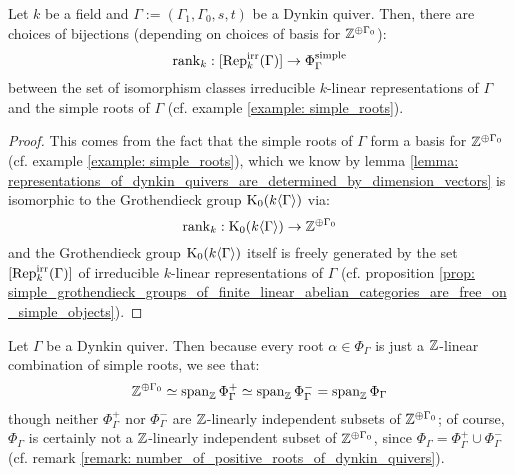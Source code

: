             \begin{proposition} \label{prop: irreducible_representations_of_dynkin_quivers_are_labelled_by_simple_roots}
                Let $k$ be a field and $\Gamma := (\Gamma_1, \Gamma_0, s, t)$ be a Dynkin quiver. Then, there are choices of bijections (depending on choices of basis for $\mathbb{Z}^{\oplus \Gamma_0}$):
                    $$\operatorname{rank}_k: [\mathrm{Rep}_k^{\mathrm{irr}}(\Gamma)] \to \Phi_{\Gamma}^{\mathrm{simple}}$$
                between the set of isomorphism classes irreducible $k$-linear representations of $\Gamma$ and the simple roots of $\Gamma$ (cf. example \ref{example: simple_roots}).
            \end{proposition}
                \begin{proof}
                    This comes from the fact that the simple roots of $\Gamma$ form a basis for $\mathbb{Z}^{\oplus \Gamma_0}$ (cf. example \ref{example: simple_roots}), which we know by lemma \ref{lemma: representations_of_dynkin_quivers_are_determined_by_dimension_vectors} is isomorphic to the Grothendieck group $\mathrm{K}_0(k\langle\Gamma\rangle)$ via:
                        $$\operatorname{rank}_k: \mathrm{K}_0(k\langle\Gamma\rangle) \to \mathbb{Z}^{\oplus \Gamma_0}$$
                    and the Grothendieck group $\mathrm{K}_0(k\langle\Gamma\rangle)$ itself is freely generated by the set $[\mathrm{Rep}_k^{\mathrm{irr}}(\Gamma)]$ of irreducible $k$-linear representations of $\Gamma$ (cf. proposition \ref{prop: simple_grothendieck_groups_of_finite_linear_abelian_categories_are_free_on_simple_objects}).
                \end{proof}
            \begin{remark}
                Let $\Gamma$ be a Dynkin quiver. Then because every root $\alpha \in \Phi_{\Gamma}$ is just a $\mathbb{Z}$-linear combination of simple roots, we see that:
                    $$\mathbb{Z}^{\oplus \Gamma_0} \simeq \operatorname{span}_{\mathbb{Z}} \Phi_{\Gamma}^+ \simeq \operatorname{span}_{\mathbb{Z}} \Phi_{\Gamma}^- = \operatorname{span}_{\mathbb{Z}} \Phi_{\Gamma}$$
                though neither $\Phi_{\Gamma}^+$ nor $\Phi_{\Gamma}^-$ are $\mathbb{Z}$-linearly independent subsets of $\mathbb{Z}^{\oplus \Gamma_0}$; of course, $\Phi_{\Gamma}$ is certainly not a $\mathbb{Z}$-linearly independent subset of $\mathbb{Z}^{\oplus \Gamma_0}$, since $\Phi_{\Gamma} = \Phi_{\Gamma}^+ \cup \Phi_{\Gamma}^-$ (cf. remark \ref{remark: number_of_positive_roots_of_dynkin_quivers}).
            \end{remark}
            
